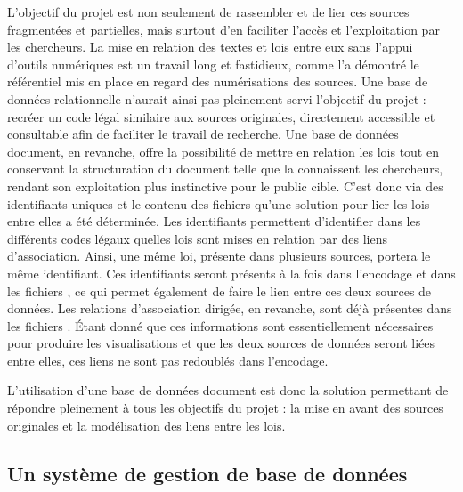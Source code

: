 L'objectif du projet est non seulement de rassembler et de lier ces sources fragmentées et partielles, mais surtout d'en faciliter l'accès et l'exploitation par les chercheurs. La mise en relation des textes et lois entre eux sans l'appui d'outils numériques est un travail long et fastidieux, comme l'a démontré le référentiel mis en place en regard des numérisations des sources. Une base de données relationnelle n'aurait ainsi pas pleinement servi l'objectif du projet : recréer un code légal similaire aux sources originales, directement accessible et consultable afin de faciliter le travail de recherche. Une base de données document, en revanche, offre la possibilité de mettre en relation les lois tout en conservant la structuration du document telle que la connaissent les chercheurs, rendant son exploitation plus instinctive pour le public cible. 
C'est donc via des identifiants uniques et le contenu des fichiers \JSON qu'une solution pour lier les lois entre elles a été déterminée. Les identifiants \XML permettent d'identifier dans les différents codes légaux quelles lois sont mises en relation par des liens d'association. Ainsi, une même loi, présente dans plusieurs sources, portera le même identifiant. Ces identifiants seront présents à la fois dans l'encodage et dans les fichiers \JSON, ce qui permet également de faire le lien entre ces deux sources de données. Les relations d'association dirigée, en revanche, sont déjà présentes dans les fichiers \JSON. Étant donné que ces informations sont essentiellement nécessaires pour produire les visualisations et que les deux sources de données seront liées entre elles, ces liens ne sont pas redoublés dans l'encodage. 

L'utilisation d'une base de données document est donc la solution permettant de répondre pleinement à tous les objectifs du projet : la mise en avant des sources originales et la modélisation des liens entre les lois. 

\subsection{Un système de gestion de base de données}

